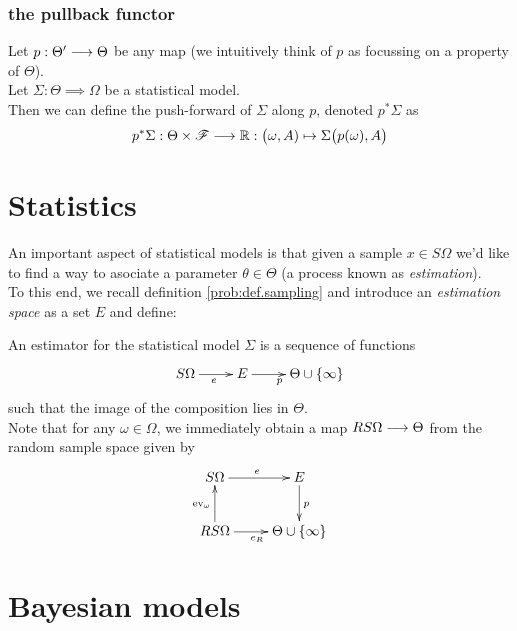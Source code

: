 \subsubsection{the pullback functor}

\begin{definition}
Let $p:\Theta'\longrightarrow \Theta$ be any map (we intuitively think of $p$ as focussing on a  property of $\Theta$).\\
Let $\Sigma: \Theta\implies \Omega$ be a statistical model.\\
Then we can define the push-forward of $\Sigma$ along $p$, denoted $p^*\Sigma$ as 
\[
p^*\Sigma: \Theta\times \r{F}\mor \d{R}: \big(\omega,A)\fun \Sigma\big(p(\omega), A\big)
\]
\end{definition}



\section{Statistics}

\noindent An important aspect of statistical models is that given a sample $x \in S\Omega$ we'd like to find a way to asociate a parameter $\theta \in \Theta$ (a process known as \emph{estimation}).\\
To this end, we  recall definition \ref{prob:def.sampling} and introduce an \emph{estimation space} as a set $E$ and define:

\begin{definition}\label{stats:def.estimators}
An estimator for the statistical model $\Sigma$ is a sequence of functions
\begin{displaymath}
\xymatrix{
S\Omega\ar[r]_{e} & E\ar[r]_p  & \Theta \cup \{\infty\}
}
\end{displaymath}
such that the image of the composition lies in $\Theta$.\\
Note that for any $\omega \in \Omega$, we immediately obtain a map $RS\Omega\longrightarrow \Theta$ from the random sample space given by
\begin{displaymath}
\xymatrix{
S\ar[r]^e\Omega & E\ar[d]^p\\
RS\ar[u]^{\ev_{\omega}}\ar[r]_{e_R}\Omega & \Theta\cup\{ \infty \}
}
\end{displaymath}
\end{definition}

\section{Bayesian models}


